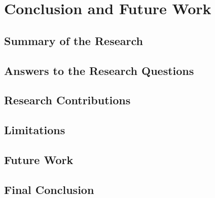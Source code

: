 \chapter{Conclusion and Future Work}

\section{Summary of the Research}

\section{Answers to the Research Questions}

\section{Research Contributions}

\section{Limitations}

\section{Future Work}

\section{Final Conclusion}